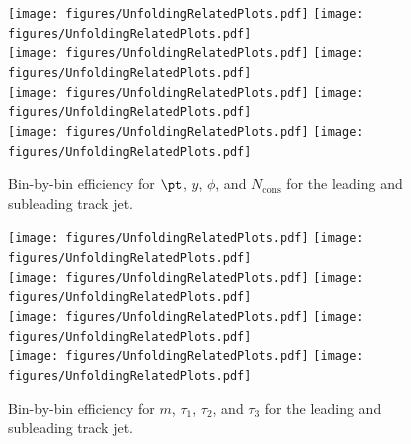 \begin{figure}[h!]
  \centering
  \texttt{[image: figures/UnfoldingRelatedPlots.pdf]}
  \texttt{[image: figures/UnfoldingRelatedPlots.pdf]} \\
  \texttt{[image: figures/UnfoldingRelatedPlots.pdf]}
  \texttt{[image: figures/UnfoldingRelatedPlots.pdf]} \\
  \texttt{[image: figures/UnfoldingRelatedPlots.pdf]}
  \texttt{[image: figures/UnfoldingRelatedPlots.pdf]} \\
  \texttt{[image: figures/UnfoldingRelatedPlots.pdf]}
  \texttt{[image: figures/UnfoldingRelatedPlots.pdf]}
  \caption{Bin-by-bin efficiency for $\pt$, $y$, $\phi$, and $N_{\text{cons}}$ for the leading and subleading track jet.}
  \label{fig:binEffTJ1}
\end{figure}

\begin{figure}[h!]
  \centering
  \texttt{[image: figures/UnfoldingRelatedPlots.pdf]}
  \texttt{[image: figures/UnfoldingRelatedPlots.pdf]} \\
  \texttt{[image: figures/UnfoldingRelatedPlots.pdf]}
  \texttt{[image: figures/UnfoldingRelatedPlots.pdf]} \\
  \texttt{[image: figures/UnfoldingRelatedPlots.pdf]}
  \texttt{[image: figures/UnfoldingRelatedPlots.pdf]} \\
  \texttt{[image: figures/UnfoldingRelatedPlots.pdf]}
  \texttt{[image: figures/UnfoldingRelatedPlots.pdf]}
  \caption{Bin-by-bin efficiency for $m$, $\tau_1$, $\tau_2$, and $\tau_3$ for the leading and subleading track jet.}
  \label{fig:binEffTJ2}
\end{figure}


